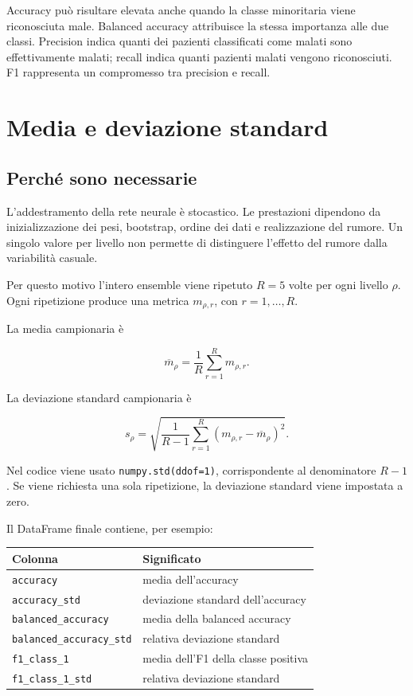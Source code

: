 \documentclass[11pt,a4paper]{article}
\begin{document}
Accuracy può risultare elevata anche quando la classe minoritaria viene riconosciuta male. Balanced accuracy attribuisce la stessa importanza alle due classi. Precision indica quanti dei pazienti classificati come malati sono effettivamente malati; recall indica quanti pazienti malati vengono riconosciuti. F1 rappresenta un compromesso tra precision e recall.

\section{Media e deviazione standard}

\subsection{Perché sono necessarie}

L'addestramento della rete neurale è stocastico. Le prestazioni dipendono da inizializzazione dei pesi, bootstrap, ordine dei dati e realizzazione del rumore. Un singolo valore per livello non permette di distinguere l'effetto del rumore dalla variabilità casuale.

Per questo motivo l'intero ensemble viene ripetuto $R=5$ volte per ogni livello $\rho$. Ogni ripetizione produce una metrica $m_{\rho,r}$, con $r=1,\ldots,R$.

La media campionaria è

\[
\overline{m}_{\rho}=\frac{1}{R}\sum_{r=1}^{R}m_{\rho,r}.
\]

La deviazione standard campionaria è

\[
s_{\rho}=\sqrt{\frac{1}{R-1}
\sum_{r=1}^{R}\left(m_{\rho,r}-\overline{m}_{\rho}\right)^2}.
\]

Nel codice viene usato \texttt{numpy.std(ddof=1)}, corrispondente al denominatore $R-1$. Se viene richiesta una sola ripetizione, la deviazione standard viene impostata a zero.

Il DataFrame finale contiene, per esempio:

\begin{center}
\begin{tabular}{ll}
\toprule
Colonna & Significato \\
\midrule
\texttt{accuracy} & media dell'accuracy \\
\texttt{accuracy\_std} & deviazione standard dell'accuracy \\
\texttt{balanced\_accuracy} & media della balanced accuracy \\
\texttt{balanced\_accuracy\_std} & relativa deviazione standard \\
\texttt{f1\_class\_1} & media dell'F1 della classe positiva \\
\texttt{f1\_class\_1\_std} & relativa deviazione standard \\
\bottomrule
\end{tabular}
\end{center}
\end{document}
